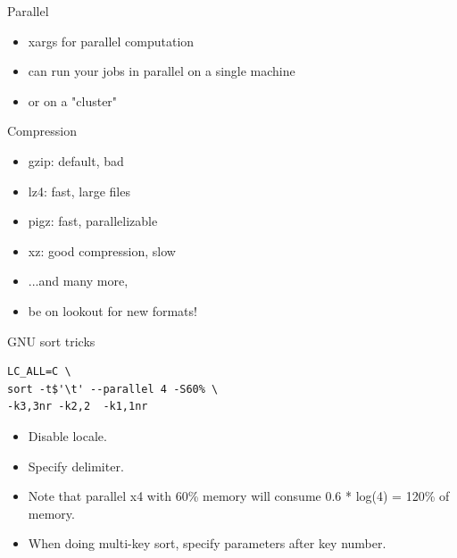 \documentclass[handout]{beamer}
\begin{document}

\begin{frame}{Parallel}

\begin{itemize}
\item xargs for parallel computation
\item can run your jobs in parallel on a single machine
\item or on a "cluster"
\end{itemize}

\end{frame}


\begin{frame}{Compression}

\begin{itemize}
\item gzip: default, bad
\item lz4: fast, large files
\item pigz: fast, parallelizable
\item xz: good compression, slow
\item ...and many more,
\item be on lookout for new formats!
\end{itemize}

\end{frame}


\begin{frame}[fragile]{GNU sort tricks}

\begin{verbatim}
LC_ALL=C \
sort -t$'\t' --parallel 4 -S60% \
-k3,3nr -k2,2  -k1,1nr
\end{verbatim}

\begin{itemize}
\item Disable locale.
\item Specify delimiter.
\item Note that parallel x4 with 60\% memory
      will consume 0.6 * log(4) = 120\% of memory.
\item When doing multi-key sort, specify parameters after key number.
\end{itemize}

\end{frame}
\end{document}
